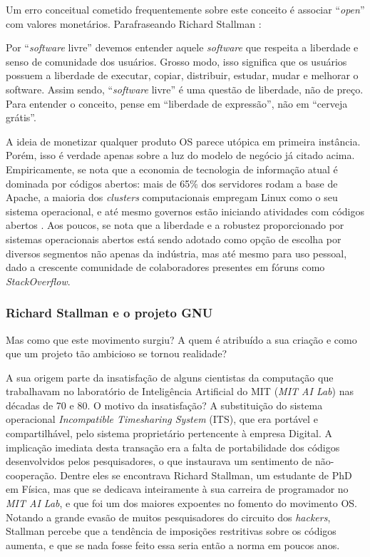 \documentclass[12pt]{article}
\begin{document}
Um erro conceitual cometido frequentemente sobre este conceito é associar ``\textit{open}'' com valores monetários. Parafraseando Richard Stallman \cite{gnu_what_is_open_source}:

\begin{displayquote}
  Por ``\textit{software} livre'' devemos entender aquele \textit{software} que respeita a liberdade e senso de comunidade dos usuários. Grosso modo, isso significa que os usuários possuem a liberdade de executar, copiar, distribuir, estudar, mudar e melhorar o software. Assim sendo, ``\textit{software} livre'' é uma questão de liberdade, não de preço. Para entender o conceito, pense em ``liberdade de expressão'', não em ``cerveja grátis''.
\end{displayquote}
A ideia de monetizar qualquer produto OS parece utópica em primeira instância. Porém, isso é verdade apenas sobre a luz do modelo de negócio já citado acima. Empiricamente, se nota que a economia de tecnologia de informação atual é dominada por códigos abertos: mais de 65\% dos servidores rodam a base de Apache, a maioria dos \textit{clusters} computacionais empregam Linux como o seu sistema operacional, e até mesmo governos estão iniciando atividades com códigos abertos \cite{Weber2005, wiki_usage_share}. Aos poucos, se nota que a liberdade e a robustez proporcionado por sistemas operacionais abertos está sendo adotado como opção de escolha por diversos segmentos não apenas da indústria, mas até mesmo para uso pessoal, dado a crescente comunidade de colaboradores presentes em fóruns como \textit{StackOverflow}.

\subsubsection{Richard Stallman e o projeto GNU}
Mas como que este movimento surgiu? A quem é atribuído a sua criação e como que um projeto tão ambicioso se tornou realidade?

A sua origem parte da insatisfação de alguns cientistas da computação que trabalhavam no laboratório de Inteligência Artificial do MIT (\textit{MIT AI Lab}) nas décadas de 70 e 80. O motivo da insatisfação? A substituição do sistema operacional \textit{Incompatible Timesharing System} (ITS), que era portável e compartilhável, pelo sistema proprietário pertencente à empresa Digital. A implicação imediata desta transação era a falta de portabilidade dos códigos desenvolvidos pelos pesquisadores, o que instaurava um sentimento de não-cooperação. Dentre eles se encontrava Richard Stallman, um estudante de PhD em Física, mas que se dedicava inteiramente à sua carreira de programador no \textit{MIT AI Lab}, e que foi um dos maiores expoentes no fomento do movimento OS. Notando a grande evasão de muitos pesquisadores do circuito dos \textit{hackers}, Stallman percebe que a tendência de imposições restritivas sobre os códigos aumenta, e que se nada fosse feito essa seria então a norma em poucos anos.
\end{document}
